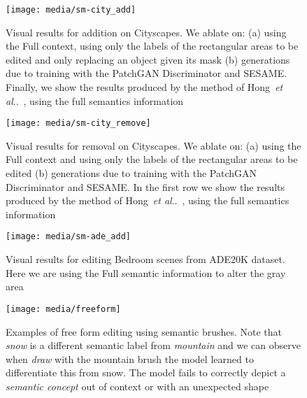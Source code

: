 \documentclass[runningheads]{llncs}
\makeatletter
\DeclareRobustCommand\onedot{\futurelet\@let@token\@onedot}
\def\@onedot{\ifx\@let@token.\else.\null\fi\xspace}
\def\etal{\emph{et al}\onedot}
\def\hong{Hong~\etal~\cite{hong2018learning}}
\makeatother
\begin{document}
\begin{figure}[]
\begin{center}
    \centering
    \texttt{[image: media/sm-city\_add]}
    \caption{Visual results for addition on Cityscapes\cite{Cordts_2016_CVPR}. We ablate on: (a) using the Full context, using only the labels of the rectangular areas to be edited and only replacing an object given its mask (b) generations due to training with the PatchGAN Discriminator and SESAME. Finally, we show the results produced by the method of \hong{}, using the full semantics information}
    \label{fig:city_add}
\end{center}
\end{figure}

\begin{figure}[]
\begin{center}
    \centering
    \texttt{[image: media/sm-city\_remove]}
    \caption{Visual results for removal on Cityscapes\cite{Cordts_2016_CVPR}. We ablate on: (a) using the Full context and using only the labels of the rectangular areas to be edited (b) generations due to training with the PatchGAN Discriminator and SESAME. In the first row we show the results produced by the method of \hong{}, using the full semantics information}
    \label{fig:city_remove}
\end{center}
\end{figure}

\begin{figure}[]
\begin{center}
    \centering
    \texttt{[image: media/sm-ade\_add]}
    \caption{Visual results for editing Bedroom scenes from ADE20K dataset. Here we are using the Full semantic information to alter the gray area}
    \label{fig:ade_add}
\end{center}
\end{figure}

\begin{figure}[]
\begin{center}
    \centering
    \texttt{[image: media/freeform]}
    \caption{Examples of free form editing using semantic brushes. Note that \emph{snow} is a different semantic label from \emph{mountain} and we can observe when \textit{draw} with the mountain brush the model learned to differentiate this from snow. The model fails to correctly depict a \textit{semantic concept} out of context or with an unexpected shape}
    \label{fig:freeform}
\end{center}
\end{figure}
\end{document}

